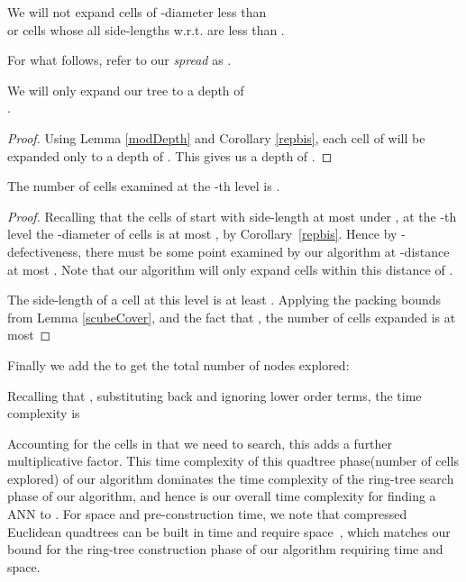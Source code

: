 \documentclass[11pt]{myclass}
\begin{document}
\begin{lemma}\label{modDepth}
We will not expand cells of -diameter less than \\ or cells whose all side-lengths w.r.t.  are less than .
\end{lemma}

For what follows, refer to our \emph{spread} as .

\begin{lemma}\label{treeDepth}
We will only expand our tree to a depth of \\.
\end{lemma}
\begin{proof}
 Using Lemma \ref{modDepth} and Corollary \ref{repbis}, each cell of  will be expanded only to a depth of 
. 
This gives us a depth of .
\end{proof}



\begin{lemma}\label{breathnum}
The number of cells examined at the -th level is  .
\end{lemma}

\begin{proof}
Recalling that the cells of  start with side-length at most  under , at the -th level the -diameter of cells is at most  , by Corollary~\ref{repbis}. 
Hence by -defectiveness, there must be some point examined by our algorithm at -distance at most
. Note that our algorithm will
only expand cells within this distance of .

The  side-length of a cell  at this level is at least . Applying the
packing bounds from Lemma \ref{scubeCover}, and the fact that , the number of cells expanded is at most

\end{proof}
Finally we add the 
 to get the total number of nodes explored: 

Recalling that , substituting back and ignoring lower order terms, the time complexity is 


Accounting for the  cells in  that we need to search, this adds a further  multiplicative factor.
This time complexity of this quadtree phase(number of cells explored) of our algorithm dominates the time complexity of the ring-tree 
search phase of our algorithm, and hence is our overall time
complexity for finding a  ANN to .
For space and pre-construction time, we note that compressed Euclidean quadtrees can be built in  time and require  space~\cite{snotes},
which matches our bound for the ring-tree construction phase of our algorithm requiring  time and  space. 
\end{document}
